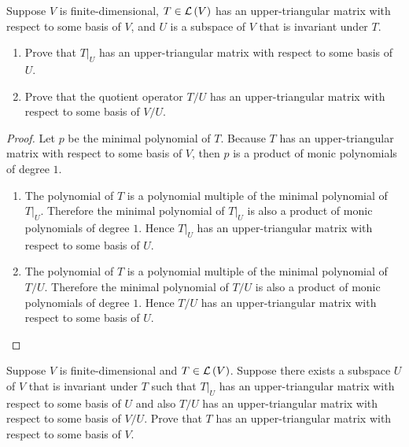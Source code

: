 \begin{exercise}
    Suppose $V$ is finite-dimensional, $T\in\mathcal{L}\left({V}\right)$ has an upper-triangular matrix with respect to some basis of $V$, and $U$ is a subspace of $V$ that is invariant under $T$.
    \begin{enumerate}[label={(\alph*)}]
        \item Prove that $T\vert_{U}$ has an upper-triangular matrix with respect to some basis of $U$.
        \item Prove that the quotient operator $T/U$ has an upper-triangular matrix with respect to some basis of $V/U$.
    \end{enumerate}
\end{exercise}

\begin{proof}
    Let $p$ be the minimal polynomial of $T$. Because $T$ has an upper-triangular matrix with respect to some basis of $V$, then $p$ is a product of monic polynomials of degree $1$.
    \begin{enumerate}[label={(\alph*)}]
        \item The polynomial of $T$ is a polynomial multiple of the minimal polynomial of $T\vert_{U}$. Therefore the minimal polynomial of $T\vert_{U}$ is also a product of monic polynomials of degree $1$. Hence $T\vert_{U}$ has an upper-triangular matrix with respect to some basis of $U$.
        \item The polynomial of $T$ is a polynomial multiple of the minimal polynomial of $T/U$. Therefore the minimal polynomial of $T/U$ is also a product of monic polynomials of degree $1$. Hence $T/U$ has an upper-triangular matrix with respect to some basis of $U$.
    \end{enumerate}
\end{proof}
\newpage

\begin{exercise}
    Suppose $V$ is finite-dimensional and $T\in \mathcal{L}\left({V}\right)$. Suppose there exists a subspace $U$ of $V$ that is invariant under $T$ such that $T\vert_{U}$ has an upper-triangular matrix with respect to some basis of $U$ and also $T/U$ has an upper-triangular matrix with respect to some basis of $V/U$. Prove that $T$ has an upper-triangular matrix with respect to some basis of $V$.
\end{exercise}

